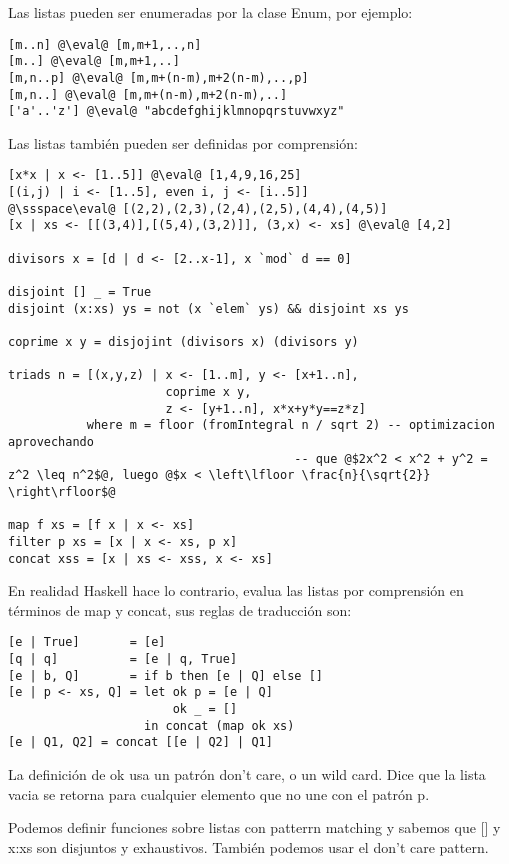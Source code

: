 \documentclass[12pt]{extarticle}
\def\ssspace{\space\space\space}
\begin{document}
Las listas pueden ser enumeradas por la clase Enum, por ejemplo:

\begin{verbatim}
[m..n] @\eval@ [m,m+1,..,n]
[m..] @\eval@ [m,m+1,..]
[m,n..p] @\eval@ [m,m+(n-m),m+2(n-m),..,p]
[m,n..] @\eval@ [m,m+(n-m),m+2(n-m),..]
['a'..'z'] @\eval@ "abcdefghijklmnopqrstuvwxyz"
\end{verbatim}

Las listas también pueden ser definidas por comprensión:

\begin{verbatim}
[x*x | x <- [1..5]] @\eval@ [1,4,9,16,25]
[(i,j) | i <- [1..5], even i, j <- [i..5]]
@\ssspace\eval@ [(2,2),(2,3),(2,4),(2,5),(4,4),(4,5)]
[x | xs <- [[(3,4)],[(5,4),(3,2)]], (3,x) <- xs] @\eval@ [4,2]

divisors x = [d | d <- [2..x-1], x `mod` d == 0]

disjoint [] _ = True
disjoint (x:xs) ys = not (x `elem` ys) && disjoint xs ys

coprime x y = disjojint (divisors x) (divisors y)

triads n = [(x,y,z) | x <- [1..m], y <- [x+1..n],
                      coprime x y,
                      z <- [y+1..n], x*x+y*y==z*z]
           where m = floor (fromIntegral n / sqrt 2) -- optimizacion aprovechando 
                                        -- que @$2x^2 < x^2 + y^2 = z^2 \leq n^2$@, luego @$x < \left\lfloor \frac{n}{\sqrt{2}} \right\rfloor$@

map f xs = [f x | x <- xs]
filter p xs = [x | x <- xs, p x]
concat xss = [x | xs <- xss, x <- xs]
\end{verbatim}

En realidad Haskell hace lo contrario, evalua las listas por comprensión en términos de map y concat, sus reglas de traducción son:

\begin{verbatim}
[e | True]       = [e]
[q | q]          = [e | q, True]
[e | b, Q]       = if b then [e | Q] else []
[e | p <- xs, Q] = let ok p = [e | Q]
                       ok _ = []
                   in concat (map ok xs)
[e | Q1, Q2] = concat [[e | Q2] | Q1]
\end{verbatim}

La definición de ok usa un patrón don't care, o un wild card. Dice que la lista vacia se retorna para cualquier elemento que no une con el patrón p.

Podemos definir funciones sobre listas con patterrn matching y sabemos que [] y x:xs son disjuntos y exhaustivos. También podemos usar el don't care pattern.
\end{document}
